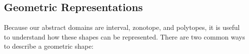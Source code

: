 \documentclass[oneside,11pt,dvipsnames]{book}
\numberwithin{equation}{section}
\theoremstyle{definition}
\theoremstyle{remark}
\newcommand{\tvn}[1]{\iftoggle{usecomment}{{\color{red}{[TVN]: #1}}}{}}
\begin{document}




\subsection{Geometric Representations}\label{sec:geometric-representations}
Because our abstract domains are interval, zonotope, and polytopes, it is useful to understand how these shapes can be represented. There are two common ways to describe a geometric shape:
\end{document}
